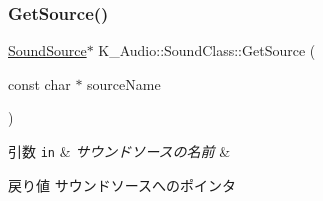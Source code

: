 \subsubsection{\texorpdfstring{Get\+Source()}{GetSource()}}
{\footnotesize\ttfamily \mbox{\hyperlink{class_k___audio_1_1_sound_source}{Sound\+Source}}$\ast$ K\+\_\+\+Audio\+::\+Sound\+Class\+::\+Get\+Source (\begin{DoxyParamCaption}\item[{const char $\ast$}]{source\+Name }\end{DoxyParamCaption})}


\begin{DoxyParams}[1]{引数}
\mbox{\tt in}  & {\em サウンドソースの名前} & \\
\hline
\end{DoxyParams}
\begin{DoxyReturn}{戻り値}
サウンドソースへのポインタ 
\end{DoxyReturn}

